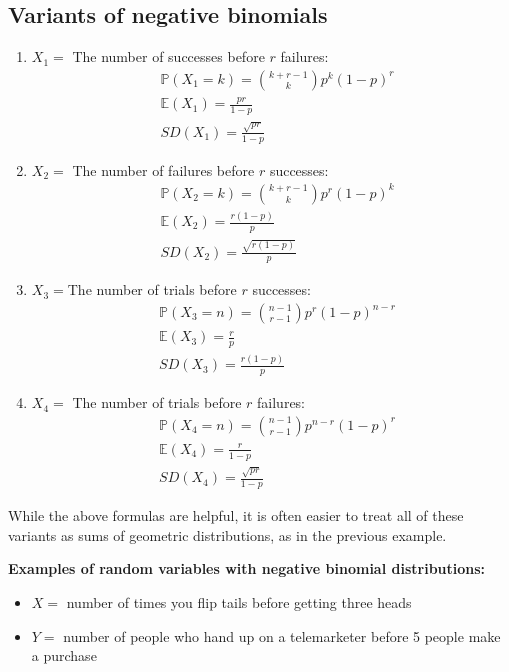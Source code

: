 \documentclass[titlepage, 12pt, leqno]{article}
\begin{document}
\subsection{Variants of negative binomials}
\begin{enumerate}
    \item $X_1 = $ The number of successes before $r$ failures:
       \begin{align*}
           & \mathbb{P}(X_1 = k) = \binom{k+r-1}{k}p^k(1-p)^r \\
           & \mathbb{E}(X_1) = \frac{pr}{1-p} \\
           & SD(X_1) = \frac{\sqrt{pr}}{1-p}
       \end{align*}
    \item $X_2 = $ The number of failures before $r$ successes:
       \begin{align*}
           & \mathbb{P}(X_2 = k) = \binom{k+r-1}{k}p^r(1-p)^k \\
           & \mathbb{E}(X_2) = \frac{r(1-p)}{p} \\
           & SD(X_2) = \frac{\sqrt{r(1-p)}}{p}
       \end{align*}
    \item $X_3 = $The number of trials before $r$ successes:
       \begin{align*}
           & \mathbb{P}(X_3 = n) = \binom{n-1}{r-1}p^r(1-p)^{n-r} \\
           & \mathbb{E}(X_3) = \frac{r}{p} \\
           & SD(X_3) = \frac{r(1-p)}{p}
       \end{align*}
    \item $X_4 = $ The number of trials before $r$ failures:
       \begin{align*}
           & \mathbb{P}(X_4 = n) = \binom{n-1}{r-1}p^{n-r}(1-p)^r \\
           & \mathbb{E}(X_4) = \frac{r}{1-p} \\
           & SD(X_4) = \frac{\sqrt{pr}}{1-p}
       \end{align*}
\end{enumerate}

\begin{note}
    While the above formulas are helpful, it is often easier to treat all of these
    variants as sums of geometric distributions, as in the previous example.
\end{note}


\textbf{Examples of random variables with negative binomial distributions:}
\begin{itemize}
    \item $X = $ number of times you flip tails before getting three heads
    \item $Y = $ number of people who hand up on a telemarketer before 5 people
        make a purchase
\end{itemize}
\end{document}
